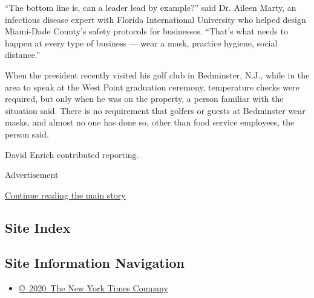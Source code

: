 ``The bottom line is, can a leader lead by example?'' said Dr. Aileen
Marty, an infectious disease expert with Florida International
University who helped design Miami-Dade County's safety protocols for
businesses. ``That's what needs to happen at every type of business ---
wear a mask, practice hygiene, social distance.''

When the president recently visited his golf club in Bedminster, N.J.,
while in the area to speak at the West Point graduation ceremony,
temperature checks were required, but only when he was on the property,
a person familiar with the situation said. There is no requirement that
golfers or guests at Bedminster wear masks, and almost no one has done
so, other than food service employees, the person said.

David Enrich contributed reporting.

Advertisement

\protect\hyperlink{after-bottom}{Continue reading the main story}

\hypertarget{site-index}{%
\subsection{Site Index}\label{site-index}}

\hypertarget{site-information-navigation}{%
\subsection{Site Information
Navigation}\label{site-information-navigation}}

\begin{itemize}
\tightlist
\item
  \href{https://help.nytimes3xbfgragh.onion/hc/en-us/articles/115014792127-Copyright-notice}{©~2020~The
  New York Times Company}
\end{itemize}

